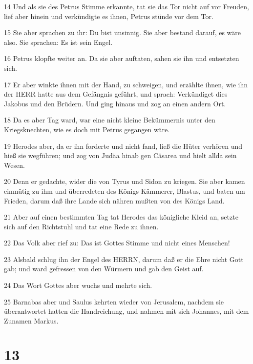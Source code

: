 \par 14 Und als sie des Petrus Stimme erkannte, tat sie das Tor nicht auf vor Freuden, lief aber hinein und verkündigte es ihnen, Petrus stünde vor dem Tor.
\par 15 Sie aber sprachen zu ihr: Du bist unsinnig. Sie aber bestand darauf, es wäre also. Sie sprachen: Es ist sein Engel.
\par 16 Petrus klopfte weiter an. Da sie aber auftaten, sahen sie ihn und entsetzten sich.
\par 17 Er aber winkte ihnen mit der Hand, zu schweigen, und erzählte ihnen, wie ihn der HERR hatte aus dem Gefängnis geführt, und sprach: Verkündiget dies Jakobus und den Brüdern. Und ging hinaus und zog an einen andern Ort.
\par 18 Da es aber Tag ward, war eine nicht kleine Bekümmernis unter den Kriegsknechten, wie es doch mit Petrus gegangen wäre.
\par 19 Herodes aber, da er ihn forderte und nicht fand, ließ die Hüter verhören und hieß sie wegführen; und zog von Judäa hinab gen Cäsarea und hielt allda sein Wesen.
\par 20 Denn er gedachte, wider die von Tyrus und Sidon zu kriegen. Sie aber kamen einmütig zu ihm und überredeten des Königs Kämmerer, Blastus, und baten um Frieden, darum daß ihre Lande sich nähren mußten von des Königs Land.
\par 21 Aber auf einen bestimmten Tag tat Herodes das königliche Kleid an, setzte sich auf den Richtstuhl und tat eine Rede zu ihnen.
\par 22 Das Volk aber rief zu: Das ist Gottes Stimme und nicht eines Menschen!
\par 23 Alsbald schlug ihn der Engel des HERRN, darum daß er die Ehre nicht Gott gab; und ward gefressen von den Würmern und gab den Geist auf.
\par 24 Das Wort Gottes aber wuchs und mehrte sich.
\par 25 Barnabas aber und Saulus kehrten wieder von Jerusalem, nachdem sie überantwortet hatten die Handreichung, und nahmen mit sich Johannes, mit dem Zunamen Markus.

\chapter{13}

